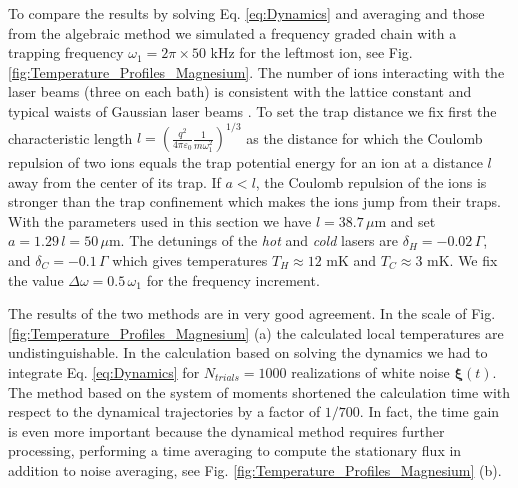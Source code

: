 To compare the results by solving Eq. \eqref{eq:Dynamics} and averaging and those from the algebraic method we  simulated a frequency graded chain with a trapping frequency $\omega_1 = 2\pi \times 50$ kHz for the leftmost ion, see Fig. \ref{fig:Temperature_Profiles_Magnesium}.  The number of ions interacting with the laser beams (three on each bath) is consistent with the lattice constant and typical waists of Gaussian laser beams \cite{Leupold2015,Lo2015}. To set the trap distance we fix first the characteristic length  $l =  \left(\frac{q^2}{4\pi\varepsilon_0}\frac{1}{m\omega_1^2}\right)^{1/3}$ as the distance for which the Coulomb repulsion of two ions equals the trap  potential energy for an ion at a distance
$l$ away from the center of its trap.
If $a<l$, the Coulomb repulsion of the ions is stronger than the trap confinement which makes the ions jump from their traps. With the parameters used in this section we have $l = 38.7\,\mu$m and set $a = 1.29 \,l=50\,\mu$m. The detunings of the \textit{hot} and \textit{cold} lasers are $\delta_H = -0.02 \, \Gamma$, and $\delta_C = -0.1 \, \Gamma$ which gives temperatures $T_H \approx 12$ mK and $T_C \approx 3$ mK. We fix the value $\Delta\omega = 0.5 \, \omega_1$ for the frequency increment.

The results of the two methods are in very good agreement. In the scale of Fig. \ref{fig:Temperature_Profiles_Magnesium} (a)
the calculated local temperatures are undistinguishable. In the calculation based on solving the dynamics we had to integrate Eq. \eqref{eq:Dynamics} for $N_{trials} = 1000$ realizations of white noise $\bm{\xi}(t)$. The method based on the system of moments
shortened the calculation time with respect to the dynamical trajectories   by a factor of $1/700$. In fact, the time gain is even more important because
the dynamical method requires further processing, performing a time averaging to compute the stationary flux in addition to noise averaging, see Fig.  \ref{fig:Temperature_Profiles_Magnesium} (b).


